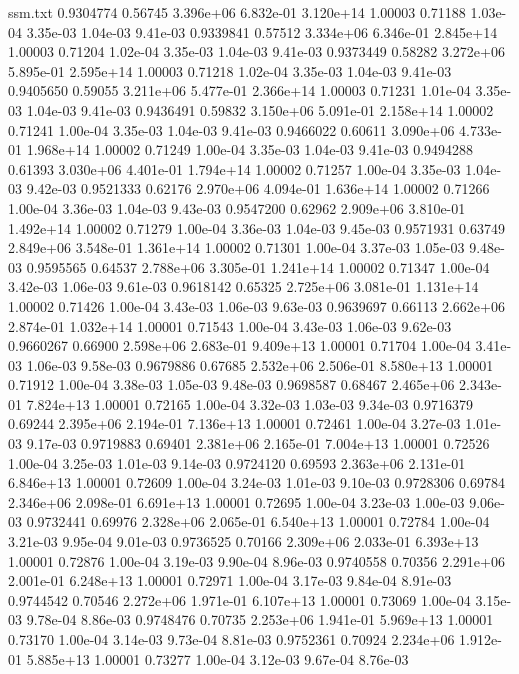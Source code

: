 \begin{filecontents}{ssm.txt}
0.9304774 0.56745 3.396e+06 6.832e-01 3.120e+14 1.00003 0.71188 1.03e-04 3.35e-03 1.04e-03 9.41e-03
0.9339841 0.57512 3.334e+06 6.346e-01 2.845e+14 1.00003 0.71204 1.02e-04 3.35e-03 1.04e-03 9.41e-03
0.9373449 0.58282 3.272e+06 5.895e-01 2.595e+14 1.00003 0.71218 1.02e-04 3.35e-03 1.04e-03 9.41e-03
0.9405650 0.59055 3.211e+06 5.477e-01 2.366e+14 1.00003 0.71231 1.01e-04 3.35e-03 1.04e-03 9.41e-03
0.9436491 0.59832 3.150e+06 5.091e-01 2.158e+14 1.00002 0.71241 1.00e-04 3.35e-03 1.04e-03 9.41e-03
0.9466022 0.60611 3.090e+06 4.733e-01 1.968e+14 1.00002 0.71249 1.00e-04 3.35e-03 1.04e-03 9.41e-03
0.9494288 0.61393 3.030e+06 4.401e-01 1.794e+14 1.00002 0.71257 1.00e-04 3.35e-03 1.04e-03 9.42e-03
0.9521333 0.62176 2.970e+06 4.094e-01 1.636e+14 1.00002 0.71266 1.00e-04 3.36e-03 1.04e-03 9.43e-03
0.9547200 0.62962 2.909e+06 3.810e-01 1.492e+14 1.00002 0.71279 1.00e-04 3.36e-03 1.04e-03 9.45e-03
0.9571931 0.63749 2.849e+06 3.548e-01 1.361e+14 1.00002 0.71301 1.00e-04 3.37e-03 1.05e-03 9.48e-03
0.9595565 0.64537 2.788e+06 3.305e-01 1.241e+14 1.00002 0.71347 1.00e-04 3.42e-03 1.06e-03 9.61e-03
0.9618142 0.65325 2.725e+06 3.081e-01 1.131e+14 1.00002 0.71426 1.00e-04 3.43e-03 1.06e-03 9.63e-03
0.9639697 0.66113 2.662e+06 2.874e-01 1.032e+14 1.00001 0.71543 1.00e-04 3.43e-03 1.06e-03 9.62e-03
0.9660267 0.66900 2.598e+06 2.683e-01 9.409e+13 1.00001 0.71704 1.00e-04 3.41e-03 1.06e-03 9.58e-03
0.9679886 0.67685 2.532e+06 2.506e-01 8.580e+13 1.00001 0.71912 1.00e-04 3.38e-03 1.05e-03 9.48e-03
0.9698587 0.68467 2.465e+06 2.343e-01 7.824e+13 1.00001 0.72165 1.00e-04 3.32e-03 1.03e-03 9.34e-03
0.9716379 0.69244 2.395e+06 2.194e-01 7.136e+13 1.00001 0.72461 1.00e-04 3.27e-03 1.01e-03 9.17e-03
0.9719883 0.69401 2.381e+06 2.165e-01 7.004e+13 1.00001 0.72526 1.00e-04 3.25e-03 1.01e-03 9.14e-03
0.9724120 0.69593 2.363e+06 2.131e-01 6.846e+13 1.00001 0.72609 1.00e-04 3.24e-03 1.01e-03 9.10e-03
0.9728306 0.69784 2.346e+06 2.098e-01 6.691e+13 1.00001 0.72695 1.00e-04 3.23e-03 1.00e-03 9.06e-03
0.9732441 0.69976 2.328e+06 2.065e-01 6.540e+13 1.00001 0.72784 1.00e-04 3.21e-03 9.95e-04 9.01e-03
0.9736525 0.70166 2.309e+06 2.033e-01 6.393e+13 1.00001 0.72876 1.00e-04 3.19e-03 9.90e-04 8.96e-03
0.9740558 0.70356 2.291e+06 2.001e-01 6.248e+13 1.00001 0.72971 1.00e-04 3.17e-03 9.84e-04 8.91e-03
0.9744542 0.70546 2.272e+06 1.971e-01 6.107e+13 1.00001 0.73069 1.00e-04 3.15e-03 9.78e-04 8.86e-03
0.9748476 0.70735 2.253e+06 1.941e-01 5.969e+13 1.00001 0.73170 1.00e-04 3.14e-03 9.73e-04 8.81e-03
0.9752361 0.70924 2.234e+06 1.912e-01 5.885e+13 1.00001 0.73277 1.00e-04 3.12e-03 9.67e-04 8.76e-03

\end{filecontents}
